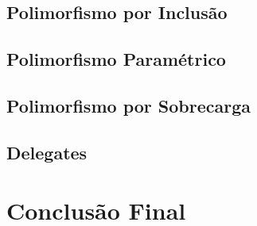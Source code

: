 \documentclass[rel_mlp]{iiufrgs}
\begin{document}
\section{Polimorfismo por Inclusão}

\section{Polimorfismo Paramétrico}

\section{Polimorfismo por Sobrecarga}

\section{Delegates}

\chapter{Conclusão Final}






%

%



%

\end{document}
